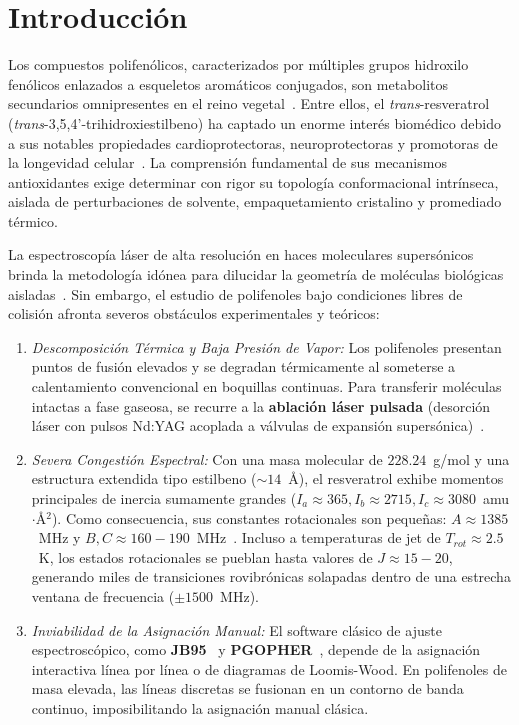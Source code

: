 \documentclass[aps,jcp,reprint,twocolumn,superscriptaddress,showpacs,amsmath,amssymb]{revtex4-2}
\begin{document}
\section{Introducci\'on}
Los compuestos polifen\'olicos, caracterizados por m\'ultiples grupos hidroxilo fen\'olicos enlazados a esqueletos arom\'aticos conjugados, son metabolitos secundarios omnipresentes en el reino vegetal~\cite{zwier2006laser,gerhards2003structure}. Entre ellos, el \textit{trans}-resveratrol (\textit{trans}-3,5,4'-trihidroxiestilbeno) ha captado un enorme inter\'es biom\'edico debido a sus notables propiedades cardioprotectoras, neuroprotectoras y promotoras de la longevidad celular~\cite{smeyers2004resveratrol}. La comprensi\'on fundamental de sus mecanismos antioxidantes exige determinar con rigor su topolog\'ia conformacional intr\'inseca, aislada de perturbaciones de solvente, empaquetamiento cristalino y promediado t\'ermico.

La espectroscop\'ia l\'aser de alta resoluci\'on en haces moleculares supers\'onicos brinda la metodolog\'ia id\'onea para dilucidar la geometr\'ia de mol\'eculas biol\'ogicas aisladas~\cite{alvarez2006rotationally,tan2019high}. Sin embargo, el estudio de polifenoles bajo condiciones libres de colisi\'on afronta severos obst\'aculos experimentales y te\'oricos:
\begin{enumerate}
    \item \textit{Descomposici\'on T\'ermica y Baja Presi\'on de Vapor:} Los polifenoles presentan puntos de fusi\'on elevados y se degradan t\'ermicamente al someterse a calentamiento convencional en boquillas continuas. Para transferir mol\'eculas intactas a fase gaseosa, se recurre a la \textbf{ablaci\'on l\'aser pulsada} (desorci\'on l\'aser con pulsos Nd:YAG acoplada a v\'alvulas de expansi\'on supers\'onica)~\cite{tan2019high}.
    \item \textit{Severa Congesti\'on Espectral:} Con una masa molecular de $228.24$~g/mol y una estructura extendida tipo estilbeno ($\sim 14$~\AA), el resveratrol exhibe momentos principales de inercia sumamente grandes ($I_a \approx 365, I_b \approx 2715, I_c \approx 3080$~amu$\cdot$\AA$^2$). Como consecuencia, sus constantes rotacionales son peque\~nas: $A \approx 1385$~MHz y $B, C \approx 160 - 190$~MHz~\cite{smeyers2004resveratrol}. Incluso a temperaturas de jet de $T_{rot} \approx 2.5$~K, los estados rotacionales se pueblan hasta valores de $J \approx 15 - 20$, generando miles de transiciones rovibr\'onicas solapadas dentro de una estrecha ventana de frecuencia ($\pm 1500$~MHz).
    \item \textit{Inviabilidad de la Asignaci\'on Manual:} El software cl\'asico de ajuste espectrosc\'opico, como \textbf{JB95}~\cite{alvarez2006rotationally} y \textbf{PGOPHER}~\cite{western2014pgopher}, depende de la asignaci\'on interactiva l\'inea por l\'inea o de diagramas de Loomis-Wood. En polifenoles de masa elevada, las l\'ineas discretas se fusionan en un contorno de banda continuo, imposibilitando la asignaci\'on manual cl\'asica.
\end{enumerate}
\end{document}
